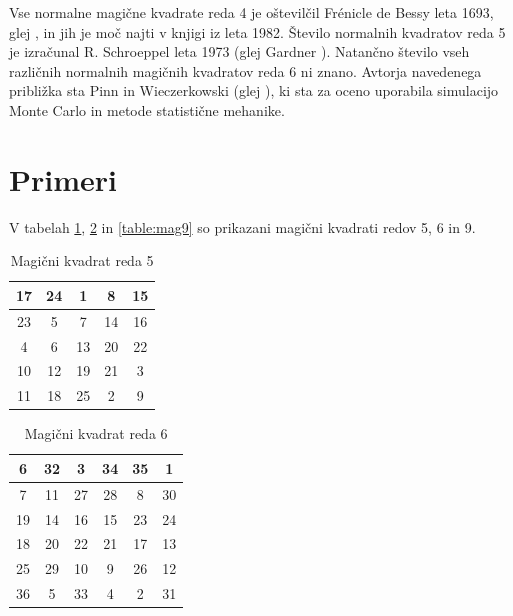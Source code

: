 \documentclass[a4paper,12pt]{article}
\begin{document}
Vse normalne magične kvadrate reda 4 je oštevilčil Frénicle de Bessy
leta 1693, glej \cite{bessy}, in jih je moč najti v knjigi \cite{berlekamp}
iz leta 1982. Število normalnih kvadratov reda 5 je izračunal
R. Schroeppel leta 1973 (glej Gardner \cite{gardner}).
Natančno število vseh različnih normalnih magičnih kvadratov reda 6 ni znano.
Avtorja navedenega približka sta Pinn in Wieczerkowski (glej \cite{pinn}), ki
sta za oceno uporabila simulacijo Monte Carlo in metode statistične mehanike.

\section{Primeri}

V tabelah \ref{table:mag5}, \ref{table:mag6} in \ref{table:mag9} so prikazani
magični kvadrati redov 5, 6 in 9.

\begin{table}[h]
   \centering
   \caption{Magični kvadrat reda 5}
   \label{table:mag5}
   \begin{tabular}{|c|c|c|c|c|}
   \hline
   17 & 24 & 1  & 8  & 15 \\ \hline
   23 & 5  & 7  & 14 & 16 \\ \hline
   4  & 6  & 13 & 20 & 22 \\ \hline
   10 & 12 & 19 & 21 & 3  \\ \hline
   11 & 18 & 25 & 2  & 9  \\ \hline
   \end{tabular}
\end{table}

\begin{table}[h]
   \centering
   \caption{Magični kvadrat reda 6}
   \label{table:mag6}
   \begin{tabular}{|c|c|c|c|c|c|}
   \hline
   6  & 32 & 3  & 34 & 35 & 1  \\ \hline
   7  & 11 & 27 & 28 & 8  & 30 \\ \hline
   19 & 14 & 16 & 15 & 23 & 24 \\ \hline
   18 & 20 & 22 & 21 & 17 & 13 \\ \hline
   25 & 29 & 10 & 9  & 26 & 12 \\ \hline
   36 & 5  & 33 & 4  & 2  & 31 \\ \hline
   \end{tabular}
\end{table}
\end{document}
